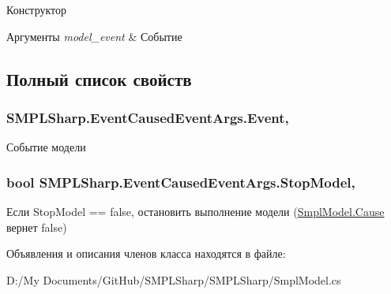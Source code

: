 Конструктор 


\begin{DoxyParams}{Аргументы}
{\em model\-\_\-event} & Событие\\
\hline
\end{DoxyParams}


\subsection{Полный список свойств}
\hypertarget{class_s_m_p_l_sharp_1_1_event_caused_event_args_a80b38440396634a116a83be4a84c5c79}{
\subsubsection[{Event}]{ S\-M\-P\-L\-Sharp.\-Event\-Caused\-Event\-Args.\-Event\hspace{0.3cm}{\ttfamily [get]}, {\ttfamily [set]}}}\label{d0/dff/class_s_m_p_l_sharp_1_1_event_caused_event_args_a80b38440396634a116a83be4a84c5c79}


Событие модели 

\hypertarget{class_s_m_p_l_sharp_1_1_event_caused_event_args_a76f44df5427c47df70a0f4eb5d1d551b}{
\subsubsection[{Stop\-Model}]{\setlength{\rightskip}{0pt plus 5cm}bool S\-M\-P\-L\-Sharp.\-Event\-Caused\-Event\-Args.\-Stop\-Model\hspace{0.3cm}{\ttfamily [get]}, {\ttfamily [set]}}}\label{d0/dff/class_s_m_p_l_sharp_1_1_event_caused_event_args_a76f44df5427c47df70a0f4eb5d1d551b}


Если Stop\-Model == false, остановить выполнение модели (\hyperlink{class_s_m_p_l_sharp_1_1_smpl_model_a1101457a63f40e7d80e707d7793f35ee}{Smpl\-Model.\-Cause} вернет false) 



Объявления и описания членов класса находятся в файле\-:\begin{DoxyCompactItemize}
\item 
D\-:/\-My Documents/\-Git\-Hub/\-S\-M\-P\-L\-Sharp/\-S\-M\-P\-L\-Sharp/Smpl\-Model.\-cs\end{DoxyCompactItemize}
